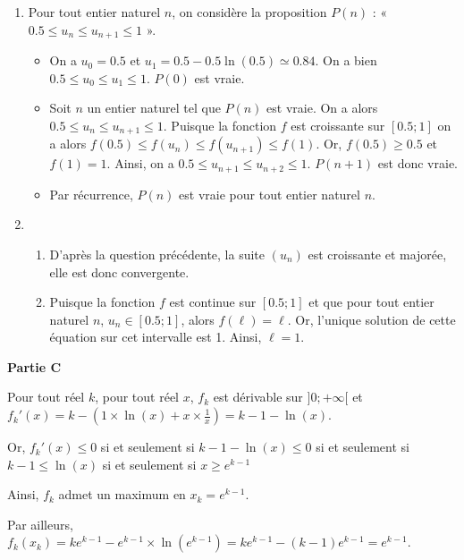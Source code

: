 \documentclass[11pt,fleqn, openany]{book} %
\begin{document}
\begin{solution}
\begin{enumerate}
\item Pour tout entier naturel $n$, on considère la proposition $P(n)$ : « $0.5\leqslant u_n \leqslant u_{n+1} \leqslant 1$ ».
\begin{itemize}
\item On a $u_0=0.5$ et $u_1=0.5-0.5\ln(0.5)\simeq 0.84$. On a bien  $0.5\leqslant u_0 \leqslant u_{1} \leqslant 1$. $P(0)$ est vraie.
\item Soit $n$ un entier naturel tel que $P(n)$ est vraie. On a alors  $0.5\leqslant u_n \leqslant u_{n+1} \leqslant 1$. Puisque la fonction $f$ est croissante sur $[0.5;1]$ on a alors $f(0.5)\leqslant f(u_n) \leqslant f(u_{n+1}) \leqslant f(1)$. Or, $f(0.5)\geqslant 0.5$ et $f(1)=1$. Ainsi, on a $0.5\leqslant u_{n+1} \leqslant u_{n+2} \leqslant 1$. $P(n+1)$ est donc vraie.
\item Par récurrence, $P(n)$ est vraie pour tout entier naturel $n$.
\end{itemize}
\item \begin{enumerate}
\item D'après la question précédente, la suite $(u_n)$ est croissante et majorée, elle est donc convergente.
 \item Puisque la fonction $f$ est continue sur $[0.5;1]$ et que pour tout entier naturel $n$, $u_n \in [0.5;1]$, alors $f(\ell)=\ell$. Or, l'unique solution de cette équation sur cet intervalle est 1. Ainsi, $\ell=1$.
\end{enumerate}
\end{enumerate}

\textbf{Partie C}

Pour tout réel $k$, pour tout réel $x$, $f_k$ est dérivable sur $]0;+\infty[$ et $f_k'(x)=k-\left(1 \times \ln(x) + x \times \frac{1}{x}\right)=k-1-\ln(x)$.

Or, $f_k'(x)\leqslant 0$ si et seulement si $k-1-\ln(x)\leqslant 0$ si et seulement si $k-1 \leqslant \ln(x)$ si et seulement si $x\geqslant e^{k-1}$

\begin{center}
\end{center}

Ainsi, $f_k$ admet un maximum en $x_k=e^{k-1}$.

 Par ailleurs, $f_k(x_k)=ke^{k-1}-e^{k-1} \times \ln(e^{k-1})=ke^{k-1}-(k-1)e^{k-1}=e^{k-1}$.\end{solution}
 
\end{document}
